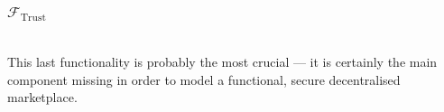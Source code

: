 \subsubsection{$\mathcal{F}_{\mathrm{Trust}}$} \ \\[0.5\baselineskip]
  This last functionality is probably the most crucial --- it is certainly the main
  component missing in order to model a functional, secure decentralised marketplace.
